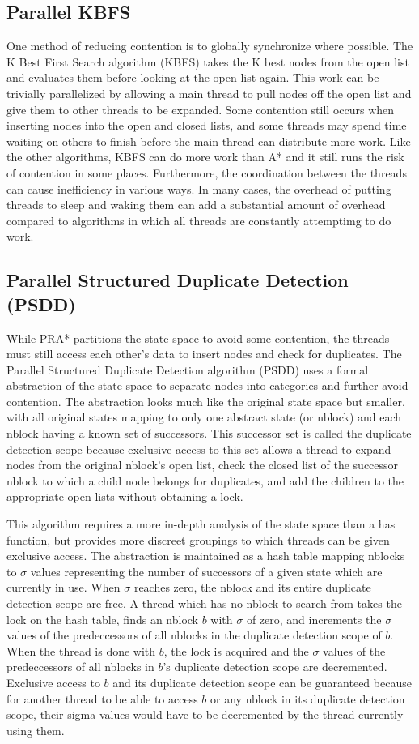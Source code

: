 \documentclass{article}
\begin{document}
\subsection{Parallel KBFS}
One method of reducing contention is to globally synchronize where possible. The K Best First Search algorithm (KBFS) takes the K best nodes from the open list and evaluates them before looking at the open list again. This work can be trivially parallelized by allowing a main thread to pull nodes off the open list and give them to other threads to be expanded. Some contention still occurs when inserting nodes into the open and closed lists, and some threads may spend time waiting on others to finish before the main thread can distribute more work. Like the other algorithms, KBFS can do more work than A* and it still runs the risk of contention in some places. Furthermore, the coordination between the threads can cause inefficiency in various ways. In many cases, the overhead of putting threads to sleep and waking them can add a substantial amount of overhead compared to algorithms in which all threads are constantly attemptimg to do work.
\subsection{Parallel Structured Duplicate Detection (PSDD)}
While PRA* partitions the state space to avoid some contention, the threads must still access each other's data to insert nodes and check for duplicates. The Parallel Structured Duplicate Detection algorithm (PSDD) uses a formal abstraction of the state space to separate nodes into categories and further avoid contention. The abstraction looks much like the original state space but smaller, with all original states mapping to only one abstract state (or nblock) and each nblock having a known set of successors. This successor set is called the duplicate detection scope because exclusive access to this set allows a thread to expand nodes from the original nblock's open list, check the closed list of the successor nblock to which a child node belongs for duplicates, and add the children to the appropriate open lists without obtaining a lock.

This algorithm requires a more in-depth analysis of the state space than a has function, but provides more discreet groupings to which threads can be given exclusive access. The abstraction is maintained as a hash table mapping nblocks to $\sigma$ values representing the number of successors of a given state which are currently in use. When $\sigma$ reaches zero, the nblock and its entire duplicate detection scope are free. A thread which has no nblock to search from takes the lock on the hash table, finds an nblock $b$ with $\sigma$ of zero, and increments the $\sigma$ values of the predeccessors of all nblocks in the duplicate detection scope of $b$. When the thread is done with $b$, the lock is acquired and the $\sigma$ values of the predeccessors of all nblocks in $b$'s duplicate detection scope are decremented. Exclusive access to $b$ and its duplicate detection scope can be guaranteed because for another thread to be able to access $b$ or any nblock in its duplicate detection scope, their sigma values would have to be decremented by the thread currently using them.
\end{document}
